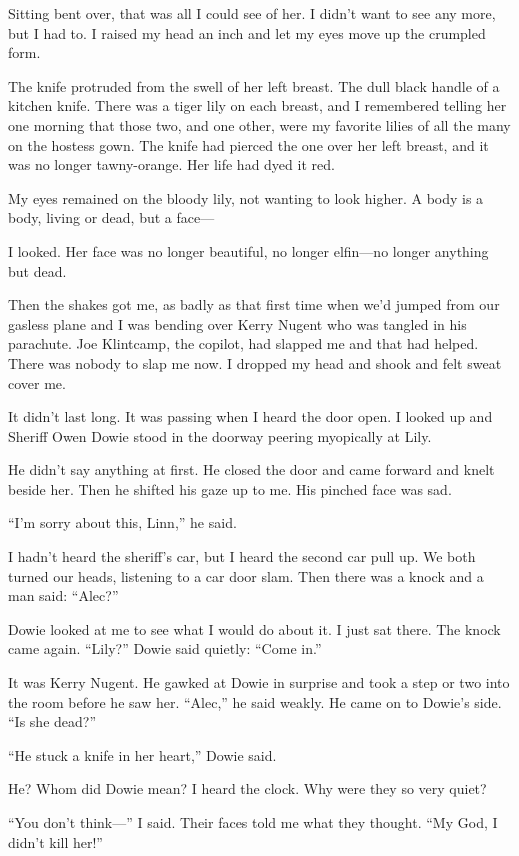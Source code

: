 \documentclass{novel}
\begin{document}
{Sitting bent over, that was all I could see of her. I didn’t want to see any more, but I had to. I raised my head an inch and let my eyes move up the crumpled form.

The knife protruded from the swell of her left breast. The dull black handle of a kitchen knife. There was a tiger lily on each breast, and I remembered telling her one morning that those two, and one other, were my favorite lilies of all the many on the hostess gown. The knife had pierced the one over her left breast, and it was no longer tawny-orange. Her life had dyed it red.

My eyes remained on the bloody lily, not wanting to look higher. A body is a body, living or dead, but a face—

I looked. Her face was no longer beautiful, no longer elfin—no longer anything but dead.

Then the shakes got me, as badly as that first time when we’d jumped from our gasless plane and I was bending over Kerry Nugent who was tangled in his parachute. Joe Klintcamp, the copilot, had slapped me and that had helped. There was nobody to slap me now. I dropped my head and shook and felt sweat cover me.

It didn’t last long. It was passing when I heard the door open. I looked up and Sheriff Owen Dowie stood in the doorway peering myopically at Lily.

He didn’t say anything at first. He closed the door and came forward and knelt beside her. Then he shifted his gaze up to me. His pinched face was sad.

“I’m sorry about this, Linn,” he said.

I hadn’t heard the sheriff’s car, but I heard the second car pull up. We both turned our heads, listening to a car door slam. Then there was a knock and a man said: “Alec?”

Dowie looked at me to see what I would do about it. I just sat there. The knock came again. “Lily?” Dowie said quietly: “Come in.”

It was Kerry Nugent. He gawked at Dowie in surprise and took a step or two into the room before he saw her. “Alec,” he said weakly. He came on to Dowie’s side. “Is she dead?”

“He stuck a knife in her heart,” Dowie said.

He? Whom did Dowie mean? I heard the clock. Why were they so very quiet?

“You don’t think—” I said. Their faces told me what they thought. “My God, I didn’t kill her!”

}
\end{document}
